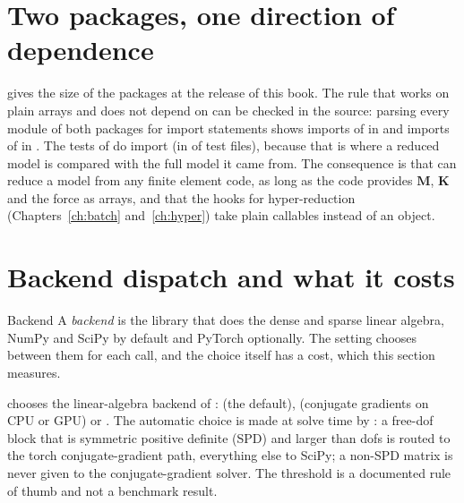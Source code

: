 \begin{table}[ht]
\centering\small

\caption{Interface conformance of the registered elements, by family.}\label{tab:ar-registry}
\end{table}

\section{Two packages, one direction of dependence}\label{sec:ar-packages}

 gives the size of the packages at the release of this book. The rule that \rom{} works on plain arrays and does not depend on \fea{} can be checked in the source: parsing every module of both packages for import statements shows \cdeFeaImportsRom{} imports of \rom{} in \fea{} and \cdeRomImportsFea{} imports of \fea{} in \rom{}. The tests of \rom{} do import \fea{} (in \cdeRomTestsImportFea{} of \cdeRomTestFiles{} test files), because that is where a reduced model is compared with the full model it came from. The consequence is that \rom{} can reduce a model from any finite element code, as long as the code provides $\bm M$, $\bm K$ and the force as arrays, and that the hooks for hyper-reduction (Chapters~\ref{ch:batch} and~\ref{ch:hyper}) take plain callables instead of an \fea{} object.

\begin{table}[ht]
\centering\small

\caption{Size of the packages: Python modules and lines (including comments and docstrings) in the source tree and in the tests.}\label{tab:ar-packages}
\end{table}

\section{Backend dispatch and what it costs}\label{sec:ar-backend}

\begin{sidenote}{Backend}
A \emph{backend} is the library that does the dense and sparse linear algebra, NumPy and SciPy by default and PyTorch optionally. The  setting chooses between them for each call, and the choice itself has a cost, which this section measures.
\end{sidenote}

 chooses the linear-algebra backend of :  (the default),  (conjugate gradients on CPU or GPU) or . The automatic choice is made at solve time by : a free-dof block that is symmetric positive definite (SPD) and larger than \cdeDispThreshold{} dofs is routed to the torch conjugate-gradient path, everything else to SciPy; a non-SPD matrix is never given to the conjugate-gradient solver. The threshold is a documented rule of thumb and not a benchmark result.

